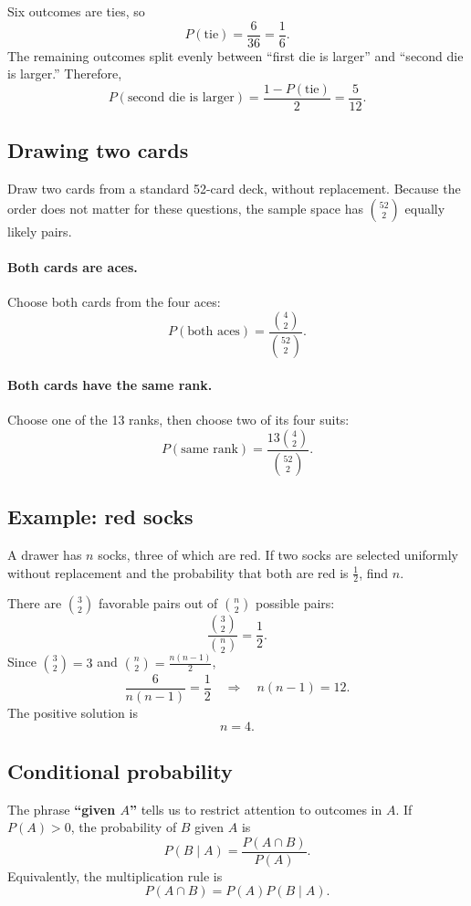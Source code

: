 \documentclass[11pt]{article}
\begin{document}
Six outcomes are ties, so
\[
P(\text{tie})=\frac{6}{36}=\frac16.
\]
The remaining outcomes split evenly between ``first die is larger''
and ``second die is larger.'' Therefore,
\[
\boxed{
P(\text{second die is larger})
=\frac{1-P(\text{tie})}{2}
=\frac{5}{12}.
}
\]

\subsection{Drawing two cards}

Draw two cards from a standard 52-card deck, without replacement.
Because the order does not matter for these questions, the sample
space has $\binom{52}{2}$ equally likely pairs.

\paragraph{Both cards are aces.}
Choose both cards from the four aces:
\[
\boxed{
P(\text{both aces})
=\frac{\binom{4}{2}}{\binom{52}{2}}.
}
\]

\paragraph{Both cards have the same rank.}
Choose one of the 13 ranks, then choose two of its four suits:
\[
\boxed{
P(\text{same rank})
=\frac{13\binom{4}{2}}{\binom{52}{2}}.
}
\]

\subsection{Example: red socks}

A drawer has $n$ socks, three of which are red. If two socks are
selected uniformly without replacement and the probability that
both are red is $\tfrac12$, find $n$.

There are $\binom{3}{2}$ favorable pairs out of $\binom{n}{2}$
possible pairs:
\[
\frac{\binom{3}{2}}{\binom{n}{2}}=\frac12.
\]
Since $\binom{3}{2}=3$ and
$\binom{n}{2}=\frac{n(n-1)}{2}$,
\[
\frac{6}{n(n-1)}=\frac12
\quad\Longrightarrow\quad
n(n-1)=12.
\]
The positive solution is
\[
\boxed{n=4.}
\]

\subsection{Conditional probability}

The phrase \textbf{``given $A$''} tells us to restrict attention to
outcomes in $A$. If $P(A)>0$, the probability of $B$ given $A$ is
\[
\boxed{
P(B\mid A)=\frac{P(A\cap B)}{P(A)}.
}
\]
Equivalently, the multiplication rule is
\[
P(A\cap B)=P(A)P(B\mid A).
\]
\end{document}
